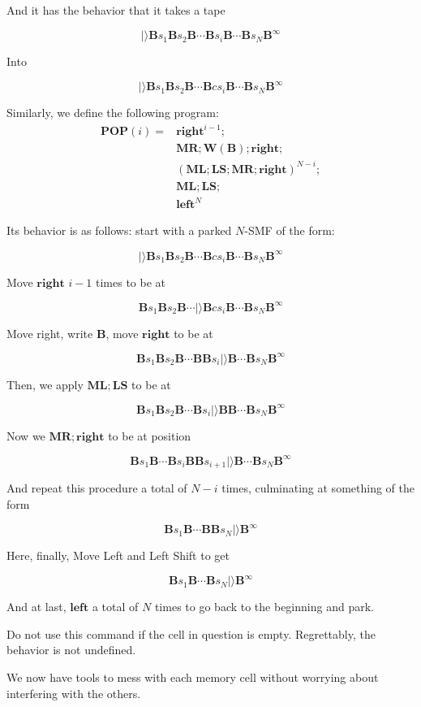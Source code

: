 \documentclass{article}
\newcommand{\B}{\mathbf{B}}
\newcommand{\MR}{\mathbf{MR}}
\newcommand{\ML}{\mathbf{ML}}
\newcommand{\W}{\mathbf{W}}
\newcommand{\LS}{\mathbf{LS}}
\newcommand{\Oright}{\mathbf{right}}
\newcommand{\Oleft}{\mathbf{left}}
\newcommand{\POP}{\mathbf{POP}}
\begin{document}
	And it has the behavior that it takes a tape
	
	\[|\rangle \B s_1 \B s_2 \B \cdots \B s_i \B \cdots \B s_N \B^\infty\]
	
	Into
	
	\[|\rangle \B s_1 \B s_2 \B \cdots \B c s_i \B \cdots \B s_N \B^\infty\]
	
	Similarly, we define the following program:
	\begin{align*}
	\POP(i) =& \Oright^{i-1};\\
	& \MR; \W(\B); \Oright;\\
	& (\ML; \LS; \MR; \Oright)^{N-i};\\
	& \ML; \LS;\\
	& \Oleft^{N}
	\end{align*}
	
	Its behavior is as follows: start with a parked $N$-SMF of the form:
	
	\[|\rangle \B s_1 \B s_2 \B \cdots \B c s_i \B \cdots \B s_N \B^\infty\]
	
	Move $\Oright$ $i-1$ times to be at
	
	\[\B s_1 \B s_2 \B \cdots |\rangle \B c s_i \B \cdots \B s_N \B^\infty\]
	
	Move right, write $\B$, move $\Oright$ to be at
	
	\[\B s_1 \B s_2 \B \cdots \B \B s_i |\rangle \B \cdots \B s_N \B^\infty\]
	
	Then, we apply $\ML; \LS$ to be at
	
	\[\B s_1 \B s_2 \B \cdots \B s_i |\rangle \B \B \cdots \B s_N \B^\infty\]
	
	Now we $\MR; \Oright$ to be at position
	
	\[\B s_1 \B \cdots \B s_i \B \B s_{i+1} |\rangle \B \cdots \B s_N \B^\infty\]
	
	And repeat this procedure a total of $N-i$ times, culminating at something of the form
	
	\[\B s_1 \B \cdots \B \B s_N |\rangle \B^\infty\]
	
	Here, finally, Move Left and Left Shift to get
	
	\[\B s_1 \B \cdots \B s_N |\rangle \B^\infty\]
	
	And at last, $\Oleft$ a total of $N$ times to go back to the beginning and park.
	
	Do not use this command if the cell in question is empty. Regrettably, the behavior is not undefined.
	
	We now have tools to mess with each memory cell without worrying about interfering with the others.
	
\end{document}
